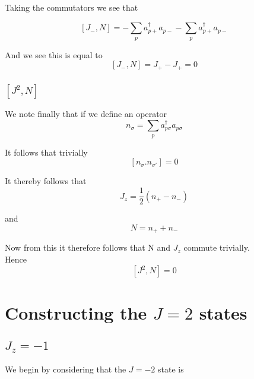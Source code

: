 \documentclass[11pt]{article} %
\begin{document}
Taking the commutators we see that\

\begin{equation}
\left[J_-,N\right]=-\sum_p a_{p+}^\dagger a_{p-} -\sum_p a_{p+}^\dagger a_{p-}
\end{equation}

And we see this is equal to\\
\begin{equation}
\left[J_-,N\right]=J_+ -J_+=0
\end{equation}

\subsubsection{$\left[J^2,N\right]$}

We note finally that if we define an operator 
\begin{equation}n_{\sigma}=\sum_p a_{p\sigma}^\dagger a_{p\sigma}\end{equation}

It follows that trivially \\

\begin{equation}
\left[n_{\sigma}.n_{\sigma'}\right]=0
\end{equation}

It thereby follows that \\

\begin{equation}
J_z=\frac{1}{2}\left(n_+ - n_-\right)
\end{equation}

and\\

\begin{equation}
N=n_++n_-
\end{equation}

Now from this it therefore follows that N and $J_z$ commute trivially.\\

Hence \\

\begin{equation}
\left[J^2,N\right]=0
\end{equation}

\section{Constructing the $J=2$ states}
\subsection{$J_z=-1$}
We begin by considering that the $J=-2$ state is\\
\end{document}
